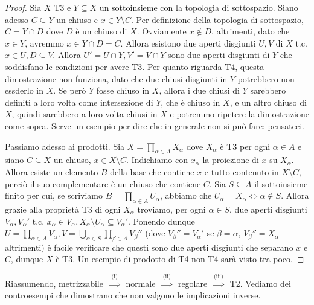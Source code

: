 \begin{proof}
  Sia $X$ T3 e $Y \subseteq X$ un sottoinsieme con la topologia di sottospazio. Siano adesso $C \subseteq Y$ un chiuso e $x \in Y \setminus C$. Per definizione della topologia di sottospazio, $C=Y \cap D$ dove $D$ è un chiuso di $X$. Ovviamente $x \not\in D$, altrimenti, dato che $x \in Y$, avremmo $x \in Y \cap D=C$. Allora esistono due aperti disgiunti $U, V$ di $X$ t.c. $x \in U, D \subseteq V$. Allora $U'=U \cap Y, V'=V \cap Y$ sono due aperti
  disgiunti di $Y$ che soddisfano le condizioni per avere T3. Per quanto riguarda T4, questa dimostrazione non funziona, dato che due chiusi disgiunti in $Y$ potrebbero non essderlo in $X$. Se però $Y$ fosse chiuso in $X$, allora i due chiusi di $Y$ sarebbero definiti a loro volta come intersezione di $Y$, che è chiuso in $X$, e un altro chiuso di $X$, quindi sarebbero a loro volta chiusi in $X$ e potremmo ripetere la dimostrazione come sopra. Serve un esempio per dire che in generale non si può fare: pensateci.

  Passiamo adesso ai prodotti. Sia $\displaystyle X=\prod_{\alpha \in A} X_{\alpha}$ dove $X_{\alpha}$ è T3 per ogni $\alpha \in A$ e siano $C \subseteq X$ un chiuso, $x \in X \setminus C$. Indichiamo con $x_{\alpha}$ la proiezione di $x$ su $X_{\alpha}$. Allora esiste un elemento $B$ della base che contiene $x$ e tutto contenuto in $X \setminus C$, perciò il suo complementare è un chiuso che contiene $C$. Sia $S \subseteq A$ il
  sottoinsieme finito per cui, se scriviamo $\displaystyle B=\prod_{\alpha \in A} U_{\alpha}$, abbiamo che $U_{\alpha}=X_{\alpha} \Leftrightarrow \alpha \not\in S$. Allora grazie alla proprietà T3 di ogni $X_{\alpha}$ troviamo, per ogni $\alpha \in S$, due aperti disgiunti $V_{\alpha}, V_{\alpha}'$  t.c.
  $x_{\alpha} \in V_{\alpha}, X_{\alpha} \setminus U_{\alpha} \subseteq V_{\alpha }'$. Ponendo dunque $\displaystyle U=\prod_{\alpha \in A} V_{\alpha}, V=\bigcup_{\alpha \in S}\prod_{\beta \in A} V_{\beta}''$ (dove $V_{\beta}''=V_{\alpha}'$ se $\beta=\alpha$, $V_{\beta}''=X_{\alpha}$ altrimenti) 
  è facile verificare che questi sono due aperti disgiunti che separano $x$ e $C$, dunque $X$ è T3. Un esempio di prodotto di T4 non T4 sarà visto tra poco.
\end{proof}

Riassumendo, metrizzabile $\stackrel{\text{(i)}}{\implies}$ normale $\stackrel{\text{(ii)}}{\implies}$ regolare $\stackrel{\text{(iii)}}{\implies}$ T2. Vediamo dei controesempi che dimostrano che non valgono le implicazioni inverse.

